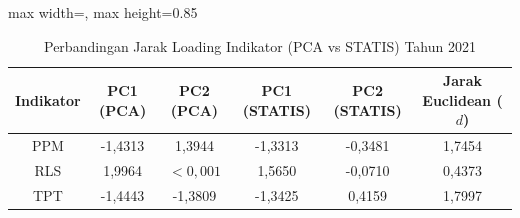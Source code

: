 \begin{table}[H]
\centering
\caption{Perbandingan Jarak Loading Indikator (PCA vs STATIS) Tahun 2021} \label{tab:sample2jarak_loading_2021}
\begin{adjustbox}{max width=\textwidth, max height=0.85\textheight}
\begin{tabular}{|c|c|c|c|c|c|}
\hline
\textbf{Indikator} & \textbf{PC1 (PCA)} & \textbf{PC2 (PCA)} & \textbf{PC1 (STATIS)} & \textbf{PC2 (STATIS)} & \textbf{Jarak Euclidean ($d$)} \\
\hline
PPM & -1,4313 & 1,3944 & -1,3313 & -0,3481 & 1,7454 \\
RLS & 1,9964 & $< 0,001$ & 1,5650 & -0,0710 & 0,4373 \\
TPT & -1,4443 & -1,3809 & -1,3425 & 0,4159 & 1,7997 \\
\hline
\end{tabular}
\end{adjustbox}
\end{table}